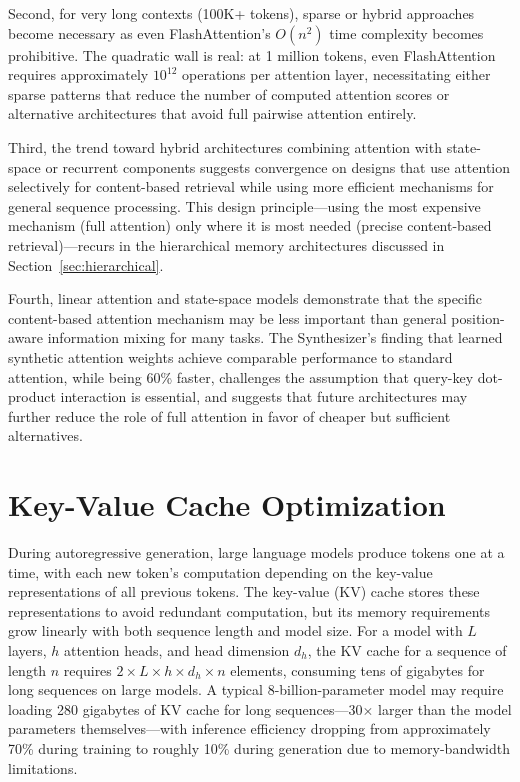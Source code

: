 \documentclass[11pt,letterpaper]{article}
\begin{document}
Second, for very long contexts (100K+ tokens), sparse or hybrid approaches become necessary as even FlashAttention's $O(n^2)$ time complexity becomes prohibitive. The quadratic wall is real: at 1 million tokens, even FlashAttention requires approximately $10^{12}$ operations per attention layer, necessitating either sparse patterns that reduce the number of computed attention scores or alternative architectures that avoid full pairwise attention entirely.

Third, the trend toward hybrid architectures combining attention with state-space or recurrent components suggests convergence on designs that use attention selectively for content-based retrieval while using more efficient mechanisms for general sequence processing. This design principle---using the most expensive mechanism (full attention) only where it is most needed (precise content-based retrieval)---recurs in the hierarchical memory architectures discussed in Section~\ref{sec:hierarchical}.

Fourth, linear attention and state-space models demonstrate that the specific content-based attention mechanism may be less important than general position-aware information mixing for many tasks. The Synthesizer's finding that learned synthetic attention weights achieve comparable performance to standard attention, while being 60\% faster, challenges the assumption that query-key dot-product interaction is essential, and suggests that future architectures may further reduce the role of full attention in favor of cheaper but sufficient alternatives.


\section{Key-Value Cache Optimization}
\label{sec:kvcache}

During autoregressive generation, large language models produce tokens one at a time, with each new token's computation depending on the key-value representations of all previous tokens. The key-value (KV) cache stores these representations to avoid redundant computation, but its memory requirements grow linearly with both sequence length and model size. For a model with $L$ layers, $h$ attention heads, and head dimension $d_h$, the KV cache for a sequence of length $n$ requires $2 \times L \times h \times d_h \times n$ elements, consuming tens of gigabytes for long sequences on large models. A typical 8-billion-parameter model may require loading 280 gigabytes of KV cache for long sequences---30$\times$ larger than the model parameters themselves---with inference efficiency dropping from approximately 70\% during training to roughly 10\% during generation due to memory-bandwidth limitations.
\end{document}
